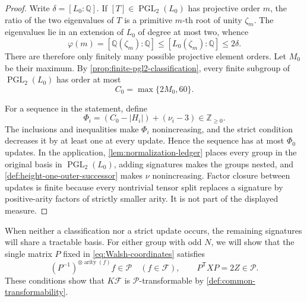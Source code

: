 \documentclass[11pt,letterpaper,onecolumn]{article}
\theoremstyle{plain}
\theoremstyle{definition}
\theoremstyle{remark}
\newcommand{\cF}{\mathcal F}
\newcommand{\cP}{\mathscr P}
\newcommand{\PGL}{\operatorname{PGL}}
\newcommand{\arity}{\operatorname{arity}}
\begin{document}
	\begin{proof}
		Write \(\delta=[L_0:\mathbb Q]\).  If
		\([T]\in\PGL_2(L_0)\) has projective order \(m\), the ratio of the two
		eigenvalues of \(T\) is a primitive \(m\)-th root of unity \(\zeta_m\).
		The eigenvalues lie in an extension of \(L_0\) of degree at most two, whence
		\[
		\varphi(m)=[\mathbb Q(\zeta_m):\mathbb Q]
		\leq [L_0(\zeta_m):\mathbb Q]\leq2\delta.
		\]
		There are therefore only finitely many possible projective element orders.
		Let \(M_0\) be their maximum.  By
		\cref{prop:finite-pgl2-classification}, every finite subgroup of
		\(\PGL_2(L_0)\) has order at most
		\[
		C_0=\max\{2M_0,60\}.
		\]
		
		For a sequence in the statement, define
		\[
		\Phi_i=(C_0-|H_i|)+(\nu_i-3)\in\mathbb Z_{\ge0}.
		\]
		The inclusions and inequalities make \(\Phi_i\) nonincreasing, and the strict
		condition decreases it by at least one at every update.  Hence the sequence
		has at most \(\Phi_0\) updates.  In the application,
		\cref{lem:normalization-ledger} places every group in the original basis in
		\(\PGL_2(L_0)\), adding signatures makes the groups nested, and
		\cref{def:height-one-outer-successor} makes \(\nu\) nonincreasing.  Factor
		closure between updates is finite because every nontrivial tensor split replaces
		a signature by positive-arity factors of strictly smaller arity. It is not
		part of the displayed measure.
	\end{proof}
	
	When neither a classification nor a strict update occurs, the remaining
	signatures will share a tractable basis. For either group with odd \(N\),
	we will show that the single matrix
	\(P\) fixed in \cref{eq:Walsh-coordinates} satisfies
	\begin{equation}
		(P^{-1})^{\otimes\arity(f)}f\in\cP
		\quad(f\in\cF),
		\qquad
		P^{\mathsf T}XP=2Z\in\cP.
		\label{eq:common-Walsh-product-presentation}
	\end{equation}
	These conditions show that \(K\cF\) is \(\cP\)-transformable
	by \cref{def:common-transformability}.
	
\end{document}
